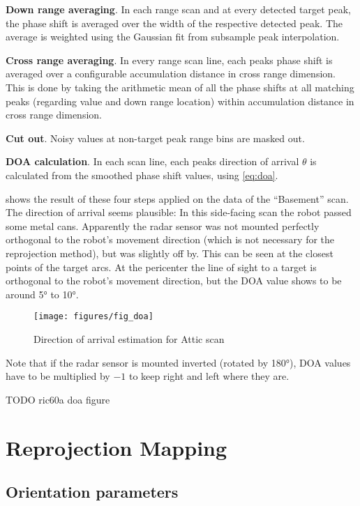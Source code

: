 \textbf{Down range averaging}. In each range scan and at every
detected target peak, the phase shift is averaged over the width of the
respective detected peak. The average is weighted using the Gaussian fit
from subsample peak interpolation.

\textbf{Cross range averaging}. In
every range scan line, each peaks phase shift is averaged over a
configurable accumulation distance in cross range dimension. This is
done by taking the arithmetic mean of all the phase shifts at all
matching peaks (regarding value and down range location) within
accumulation distance in cross range dimension.

\textbf{Cut out}. Noisy
values at non-target peak range bins are masked out.

\textbf{DOA calculation}. In each scan line, each peaks direction of arrival
\(\theta\) is calculated from the smoothed phase shift values, using \cref{eq:doa}.

 shows the result of these four steps applied on the data of
the ``Basement'' scan. The direction of arrival seems plausible: In this
side-facing scan the robot passed some metal cans. Apparently the radar
sensor was not mounted perfectly orthogonal to the robot's movement
direction (which is not necessary for the reprojection method), but was
slightly off by. This can be seen at the closest points of the target
arcs. At the pericenter the line of sight to a target is orthogonal to
the robot's movement direction, but the DOA value shows to be around \ang{5}
to \ang{10}.

\begin{figure}[htbp]
    \centering
    \texttt{[image: figures/fig\_doa]}
    \caption{Direction of arrival estimation for Attic scan}
    \label{fig:fig_doa}
\end{figure}

Note that if the radar sensor is mounted inverted (rotated by \ang{180}), DOA
values have to be multiplied by \(-1\) to keep right and left where they
are.

TODO ric60a doa figure

\section{Reprojection Mapping}\label{reprojection-mapping}

\subsection{Orientation parameters}\label{orientation-parameters}

